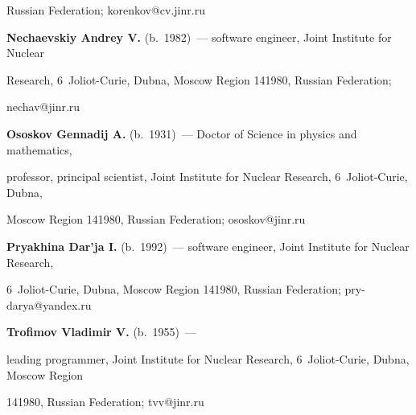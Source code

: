 Russian Federation; korenkov@cv.jinr.ru





\vspace*{4pt}





\noindent


\textbf{Nechaevskiy Andrey V.} (b.\ 1982)~--- software engineer, Joint Institute for Nuclear


Research, 6~Joliot-Curie, Dubna, Moscow Region 141980, Russian Federation;


nechav@jinr.ru





\vspace*{4pt}







\noindent


\textbf{Ososkov Gennadij A.} (b.\ 1931)~--- Doctor of Science in physics and mathematics,


professor, principal scientist,  Joint Institute for Nuclear Research, 6~Joliot-Curie, Dubna,


Moscow Region 141980, Russian Federation; ososkov@jinr.ru





\vspace*{4pt}





\noindent


\textbf{Pryakhina Dar'ja I.} (b.\ 1992)~--- software engineer, Joint Institute for Nuclear Research,


6~Joliot-Curie, Dubna, Moscow Region 141980, Russian Federation; pry-darya@yandex.ru





\vspace*{4pt}





\noindent


\textbf{Trofimov Vladimir V.} (b.\ 1955)~---


leading programmer, Joint Institute for Nuclear Research, 6~Joliot-Curie, Dubna, Moscow Region


141980, Russian Federation; tvv@jinr.ru





